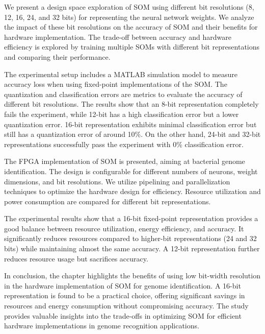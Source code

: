 We present a design space exploration of SOM using different bit resolutions (8, 12, 16, 24, and 32 bits) for representing the neural network weights. We analyze the impact of these bit resolutions on the accuracy of SOM and their benefits for hardware implementation. The trade-off between accuracy and hardware efficiency is explored by training multiple SOMs with different bit representations and comparing their performance.

The experimental setup includes a MATLAB simulation model to measure accuracy loss when using fixed-point implementations of the SOM. The quantization and classification errors are metrics to evaluate the accuracy of different bit resolutions. The results show that an 8-bit representation completely fails the experiment, while 12-bit has a high classification error but a lower quantization error. 16-bit representation exhibits minimal classification error but still has a quantization error of around 10\%. On the other hand, 24-bit and 32-bit representations successfully pass the experiment with 0\% classification error.

The FPGA implementation of SOM is presented, aiming at bacterial genome identification. The design is configurable for different numbers of neurons, weight dimensions, and bit resolutions. We utilize pipelining and parallelization techniques to optimize the hardware design for efficiency. Resource utilization and power consumption are compared for different bit representations.

The experimental results show that a 16-bit fixed-point representation provides a good balance between resource utilization, energy efficiency, and accuracy. It significantly reduces resources compared to higher-bit representations (24 and 32 bits) while maintaining almost the same accuracy. A 12-bit representation further reduces resource usage but sacrifices accuracy.

In conclusion, the chapter highlights the benefits of using low bit-width resolution in the hardware implementation of SOM for genome identification. A 16-bit representation is found to be a practical choice, offering significant savings in resources and energy consumption without compromising accuracy. The study provides valuable insights into the trade-offs in optimizing SOM for efficient hardware implementations in genome recognition applications.